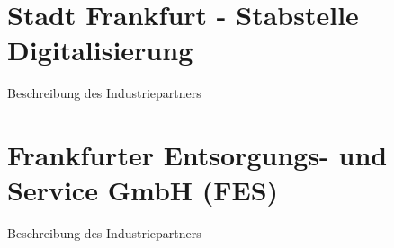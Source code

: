 \section{Stadt Frankfurt - Stabstelle Digitalisierung}


    Beschreibung des Industriepartners


\section{Frankfurter Entsorgungs- und Service GmbH (FES)}

    Beschreibung des Industriepartners
